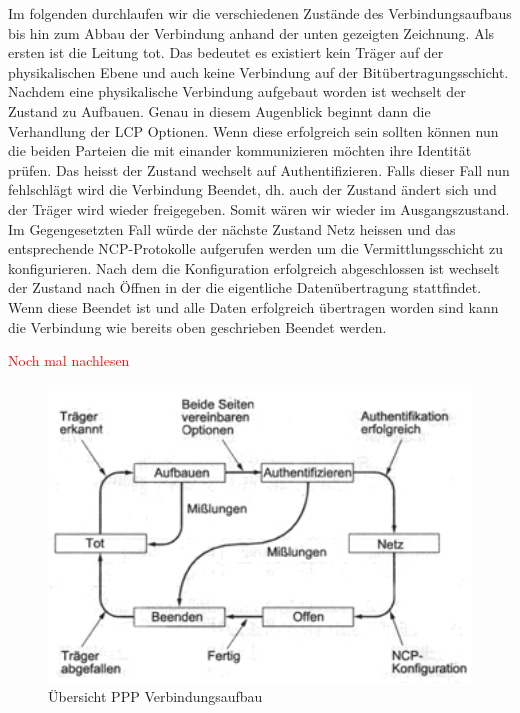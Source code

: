 \documentclass[12pt, a4paper, ngerman]{article}
\begin{document}
Im folgenden durchlaufen wir die verschiedenen Zustände des Verbindungsaufbaus bis hin zum Abbau der Verbindung anhand der unten gezeigten Zeichnung.
Als ersten ist die Leitung tot. Das bedeutet es existiert kein Träger auf der physikalischen Ebene und auch keine Verbindung auf der Bitübertragungsschicht.
Nachdem eine physikalische Verbindung aufgebaut worden ist wechselt der Zustand zu Aufbauen. Genau in diesem Augenblick beginnt dann die Verhandlung der LCP Optionen. Wenn diese erfolgreich sein sollten können nun die beiden Parteien die mit einander kommunizieren möchten ihre Identität prüfen. Das heisst der Zustand wechselt auf Authentifizieren. Falls dieser Fall nun fehlschlägt wird die Verbindung Beendet, dh. auch der Zustand ändert sich und der Träger wird wieder freigegeben. Somit wären wir wieder im Ausgangszustand. Im Gegengesetzten Fall würde der nächste Zustand Netz heissen und das entsprechende NCP-Protokolle aufgerufen werden um die Vermittlungsschicht zu konfigurieren. Nach dem die Konfiguration erfolgreich abgeschlossen ist wechselt der Zustand nach Öffnen in der die eigentliche Datenübertragung stattfindet. Wenn diese Beendet ist und alle Daten erfolgreich übertragen worden sind kann die Verbindung wie bereits oben geschrieben Beendet werden.

\large{\textcolor{red}{Noch mal nachlesen}}

\begin{figure}[H]
	\centering
	\includegraphics[width=1\textwidth]{Grafiken/ppp.jpg}	
	\caption{Übersicht PPP Verbindungsaufbau \cite{*}}
	\label{aufbau_ppp-verbindung}
\end{figure}
\end{document}
